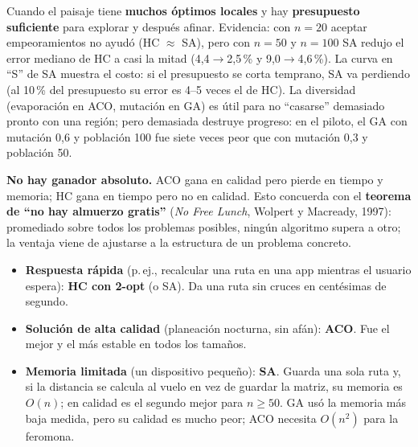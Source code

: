 \documentclass[11pt,a4paper]{article}
\begin{document}
\begin{respuesta}
Cuando el paisaje tiene \textbf{muchos óptimos locales} y hay \textbf{presupuesto suficiente} para explorar y después afinar. Evidencia: con $n=20$ aceptar empeoramientos no ayudó (HC $\approx$ SA),
pero con $n=50$ y $n=100$ SA redujo el error mediano de HC a casi la mitad (4{,}4$\to$2{,}5\,\% y 9{,}0$\to$4{,}6\,\%).
La curva en ``S'' de SA muestra el costo: si el presupuesto se corta temprano, SA va perdiendo (al 10\,\% del presupuesto su error es 4--5 veces el de HC).
La diversidad (evaporación en ACO, mutación en GA) es útil para no ``casarse'' demasiado pronto con una región; pero demasiada destruye progreso: en el piloto, el GA con mutación 0{,}6 y población 100
fue siete veces peor que con mutación 0{,}3 y población 50.
\end{respuesta}

\begin{respuesta}
\textbf{No hay ganador absoluto.} ACO gana en calidad pero pierde en tiempo y memoria; HC gana en tiempo pero no en calidad. Esto concuerda con el
\textbf{teorema de ``no hay almuerzo gratis''} (\emph{No Free Lunch}, Wolpert y Macready, 1997): promediado sobre todos los problemas posibles, ningún algoritmo supera a otro;
la ventaja viene de ajustarse a la estructura de un problema concreto.
\begin{itemize}
\item \textbf{Respuesta rápida} (p.\,ej., recalcular una ruta en una app mientras el usuario espera): \textbf{HC con 2-opt} (o SA). Da una ruta sin cruces en centésimas de segundo.
\item \textbf{Solución de alta calidad} (planeación nocturna, sin afán): \textbf{ACO}. Fue el mejor y el más estable en todos los tamaños.
\item \textbf{Memoria limitada} (un dispositivo pequeño): \textbf{SA}. Guarda una sola ruta y, si la distancia se calcula al vuelo en vez de guardar la matriz, su memoria es $O(n)$;
      en calidad es el segundo mejor para $n\ge50$. GA usó la memoria más baja medida, pero su calidad es mucho peor; ACO necesita $O(n^2)$ para la feromona.
\end{itemize}
\end{respuesta}
\end{document}
